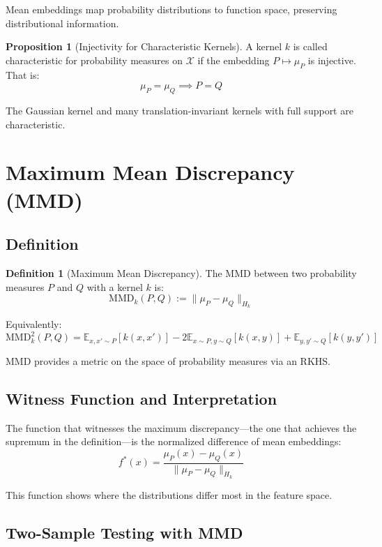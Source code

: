 \documentclass[12pt,a4paper]{article}
\theoremstyle{definition}
\newtheorem{definition}{Definition}[section]
\newtheorem{proposition}{Proposition}[section]
\begin{document}
Mean embeddings map probability distributions to function space, preserving distributional information.

\begin{proposition}[Injectivity for Characteristic Kernels]
A kernel $k$ is called characteristic for probability measures on $\mathcal{X}$ if the embedding $P \mapsto \mu_P$ is injective. That is:
\[
\mu_P = \mu_Q \implies P = Q
\]

The Gaussian kernel and many translation-invariant kernels with full support are characteristic.
\end{proposition}

\section{Maximum Mean Discrepancy (MMD)}

\subsection{Definition}

\begin{definition}[Maximum Mean Discrepancy]
The MMD between two probability measures $P$ and $Q$ with a kernel $k$ is:
\[
\text{MMD}_k(P, Q) := \|\mu_P - \mu_Q\|_{H_k}
\]

Equivalently:
\[
\text{MMD}_k^2(P, Q) = \mathbb{E}_{x,x' \sim P}[k(x, x')] - 2\mathbb{E}_{x \sim P, y \sim Q}[k(x, y)] + \mathbb{E}_{y,y' \sim Q}[k(y, y')]
\]
\end{definition}

MMD provides a metric on the space of probability measures via an RKHS.

\subsection{Witness Function and Interpretation}

The function that witnesses the maximum discrepancy—the one that achieves the supremum in the definition—is the normalized difference of mean embeddings:
\[
f^*(x) = \frac{\mu_P(x) - \mu_Q(x)}{\|\mu_P - \mu_Q\|_{H_k}}
\]

This function shows where the distributions differ most in the feature space.

\subsection{Two-Sample Testing with MMD}
\end{document}
